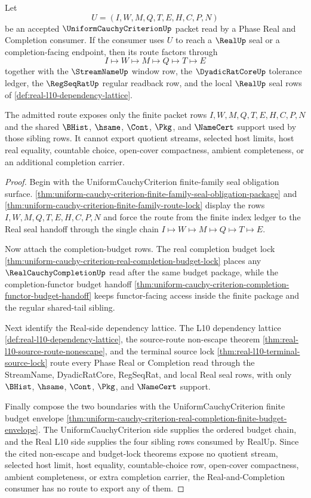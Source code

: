 \begin{theorem}
\label{thm:real-uniform-cauchy-completion-route-lock}
Let
$$
U=(I,W,M,Q,T,E,H,C,P,N)
$$
be an accepted $\UniformCauchyCriterionUp$ packet read by a Phase Real and
Completion consumer. If the consumer uses $U$ to reach a $\RealUp$ seal or a
completion-facing endpoint, then its route factors through
$$
I \longmapsto W \longmapsto M \longmapsto Q \longmapsto T \longmapsto E
$$
together with the $\StreamNameUp$ window row, the $\DyadicRatCoreUp$
tolerance ledger, the $\RegSeqRatUp$ regular readback row, and the local
$\RealUp$ seal rows of \autoref{def:real-l10-dependency-lattice}.

The admitted route exposes only the finite packet rows $I,W,M,Q,T,E,H,C,P,N$
and the shared $\BHist$, $\hsame$, $\Cont$, $\Pkg$, and $\NameCert$ support
used by those sibling rows. It cannot export quotient streams, selected host
limits, host real equality, countable choice, open-cover compactness, ambient
completeness, or an additional completion carrier.
\end{theorem}
\begin{proof}
Begin with the UniformCauchyCriterion finite-family seal obligation surface.
\autoref{thm:uniform-cauchy-criterion-finite-family-seal-obligation-package}
and \autoref{thm:uniform-cauchy-criterion-finite-family-route-lock} display
the rows $I,W,M,Q,T,E,H,C,P,N$ and force the route from the finite index
ledger to the Real seal handoff through the single chain
$I \longmapsto W \longmapsto M \longmapsto Q \longmapsto T \longmapsto E$.

Now attach the completion-budget rows. The real completion budget lock
\autoref{thm:uniform-cauchy-criterion-real-completion-budget-lock} places any
$\RealCauchyCompletionUp$ read after the same budget package, while the
completion-functor budget handoff
\autoref{thm:uniform-cauchy-criterion-completion-functor-budget-handoff}
keeps functor-facing access inside the finite package and the regular
shared-tail sibling.

Next identify the Real-side dependency lattice. The L10 dependency lattice
\autoref{def:real-l10-dependency-lattice}, the source-route non-escape theorem
\autoref{thm:real-l10-source-route-nonescape}, and the terminal source lock
\autoref{thm:real-l10-terminal-source-lock} route every Phase Real or
Completion read through the StreamName, DyadicRatCore, RegSeqRat, and local
Real seal rows, with only $\BHist$, $\hsame$, $\Cont$, $\Pkg$, and
$\NameCert$ support.

Finally compose the two boundaries with the UniformCauchyCriterion finite
budget envelope
\autoref{thm:uniform-cauchy-criterion-real-completion-finite-budget-envelope}.
The UniformCauchyCriterion side supplies the ordered budget chain, and the
Real L10 side supplies the four sibling rows consumed by RealUp. Since the
cited non-escape and budget-lock theorems expose no quotient stream, selected
host limit, host equality, countable-choice row, open-cover compactness,
ambient completeness, or extra completion carrier, the Real-and-Completion
consumer has no route to export any of them.
\end{proof}

